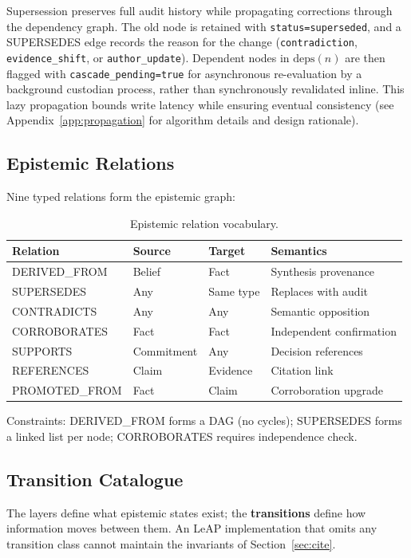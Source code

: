 \documentclass[11pt,letterpaper]{article}
\begin{document}
Supersession preserves full audit history while propagating corrections through the dependency graph. The old node is retained with \texttt{status=superseded}, and a SUPERSEDES edge records the reason for the change (\texttt{contradiction}, \texttt{evidence\_shift}, or \texttt{author\_update}). Dependent nodes in $\text{deps}(n)$ are then flagged with \texttt{cascade\_pending=true} for asynchronous re-evaluation by a background custodian process, rather than synchronously revalidated inline. This lazy propagation bounds write latency while ensuring eventual consistency (see Appendix~\ref{app:propagation} for algorithm details and design rationale).

\subsection{Epistemic Relations}

Nine typed relations form the epistemic graph:

\begin{table}[H]
\centering
\caption{Epistemic relation vocabulary.}
\label{tab:relations}
\begin{tabular}{@{}llll@{}}
\toprule
\textbf{Relation} & \textbf{Source} & \textbf{Target} & \textbf{Semantics} \\
\midrule
DERIVED\_FROM & Belief & Fact & Synthesis provenance \\
SUPERSEDES & Any & Same type & Replaces with audit \\
CONTRADICTS & Any & Any & Semantic opposition \\
CORROBORATES & Fact & Fact & Independent confirmation \\
SUPPORTS & Commitment & Any & Decision references \\
REFERENCES & Claim & Evidence & Citation link \\
PROMOTED\_FROM & Fact & Claim & Corroboration upgrade \\
\bottomrule
\end{tabular}
\end{table}

Constraints: DERIVED\_FROM forms a DAG (no cycles); SUPERSEDES forms a linked list per node; CORROBORATES requires independence check.

\subsection{Transition Catalogue}

The layers define what epistemic states exist; the \textbf{transitions} define how information moves between them. An LeAP implementation that omits any transition class cannot maintain the invariants of Section~\ref{sec:cite}.
\end{document}
